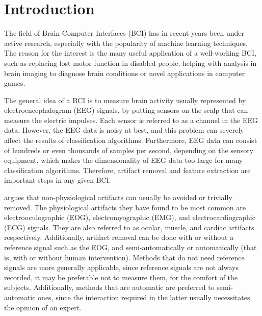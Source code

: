 \section{Introduction}\label{sec:introduction}
The field of Brain-Computer Interfaces (BCI) has in recent years been under active research, especially with the popularity of machine learning techniques. The reason for the interest is the many useful application of a well-working BCI, such as replacing lost motor function in disabled people, helping with analysis in brain imaging to diagnose brain conditions or novel applications in computer games. 

The general idea of a BCI is to measure brain activity usually represented by electroencephalogram (EEG) signals, by putting sensors on the scalp that can measure the electric impulses. Each sensor is referred to as a channel in the EEG data. However, the EEG data is noisy at best, and this problem can severely affect the results of classification algorithms. Furthermore, EEG data can consist of hundreds or even thousands of samples per second, depending on the sensory equipment, which makes the dimensionality of EEG data too large for many classification algorithms. Therefore, artifact removal and feature extraction are important steps in any given BCI.

\cite{uriguen2015eeg} argues that non-physiological artifacts can usually be avoided or trivially removed. The physiological artifacts they have found to be most common are electrooculographic (EOG), electromyographic (EMG), and electrocardiographic (ECG) signals. They are also referred to as ocular, muscle, and cardiac artifacts respectively. Additionally, artifact removal can be done with or without a reference signal such as the EOG, and semi-automatically or automatically (that is, with or without human intervention). Methods that do not need reference signals are more generally applicable, since reference signals are not always recorded, it may be preferable not to measure them, for the comfort of the subjects. Additionally, methods that are automatic are preferred to semi-automatic ones, since the interaction required in the latter usually necessitates the opinion of an expert.

